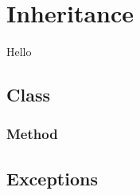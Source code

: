 \chapter{Inheritance}
\label{sec:inheritance}

Hello

\begin{syntaxfloat}
  
  \caption{Class definition with inherence}
  \label{syntax:inheritance:class}
\end{syntaxfloat}

\section{ Class}

\subsection{ Method}
\label{sec:inheritance:ToString}

\section{Exceptions}
\label{sec:inheritance:exceptions}

\subsection{\csharp}


